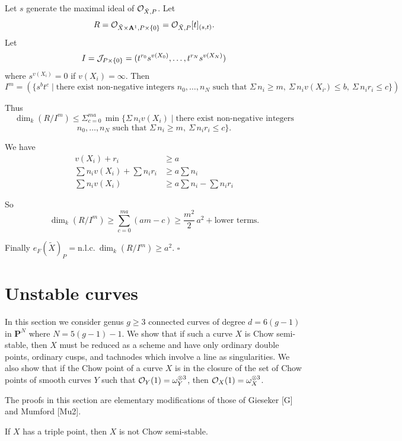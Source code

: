 \documentclass[12pt]{memoir}
\begin{document}
\begin{ptcbp}
Let $s$ generate the maximal ideal of $\mathcal{O}_{\tilde{X},P}$. Let
\[
R = \mathcal{O}_{\tilde{X} \times \mathbf{A}^1, P \times \{0\}} = \mathcal{O}_{\tilde{X},P}[t]_{(s,t)}.
\]
Let
\[
I = \mathcal{J}_{P \times \{0\}} = (t^{r_0} s^{v(X_0)}, \dots, t^{r_N} s^{v(X_N)})
\]
where $s^{v(X_i)} = 0$ if $v(X_i) = \infty$. Then
\[
I^m = (\{s^b t^c \mid \text{there exist non-negative integers } n_0, \dots, n_N \text{ such that } \Sigma\, n_i \geqslant m,\ \Sigma\, n_i v(X_i) \leqslant b,\ \Sigma\, n_i r_i \leqslant c\}).
\]


Thus
\[
\dim_k(R/I^m) \leqslant \Sigma_{c=0}^{ma}\, \min\{\Sigma\, n_i v(X_i) \mid \text{there exist non-negative integers}
\]
\[
n_0, \dots, n_N \text{ such that } \Sigma\, n_i \geqslant m,\ \Sigma\, n_i r_i \leqslant c\}.
\]

We have
\begin{align*}
v(X_i) + r_i &\geqslant a \\
\sum n_i v(X_i) + \sum n_i r_i &\geqslant a \sum n_i \\
\sum n_i v(X_i) &\geqslant a \sum n_i - \sum n_i r_i
\end{align*}

So
\[
\dim_k(R/I^m) \geqslant \sum_{c=0}^{ma} (am - c) \geqslant \frac{m^2}{2}\, a^2 + \text{lower terms.}
\]

Finally $e_F(\tilde{X})_P = \text{n.l.c.}\ \dim_k(R/I^m) \geqslant a^2$. \hfill$\square$
\end{ptcbp}

\section{Unstable curves}

In this section we consider genus $g \geqslant 3$ connected curves of degree $d = 6(g-1)$ in $\mathbf{P}^N$ where $N = 5(g-1)-1$. We show that if such a curve $X$ is Chow semi-stable, then $X$ must be reduced as a scheme and have only ordinary double points, ordinary cusps, and tachnodes which involve a line as singularities. We also show that if the Chow point of a curve $X$ is in the closure of the set of Chow points of smooth curves $Y$ such that $\mathcal{O}_Y(1) = \omega_Y^{\otimes 3}$, then $\mathcal{O}_X(1) = \omega_X^{\otimes 3}$.

The proofs in this section are elementary modifications of those of Gieseker [G] and Mumford [Mu2].

\begin{Lem}\label{lem:2.1}
If $X$ has a triple point, then $X$ is not Chow semi-stable.
\end{Lem}
\end{document}
